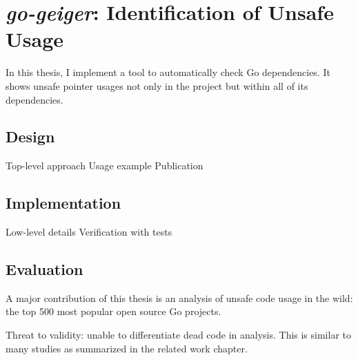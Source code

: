 
\chapter{\textit{go-geiger}: Identification of Unsafe Usage}\label{ch:go-geiger}

In this thesis, I implement a tool to automatically check Go dependencies. It shows unsafe
pointer usages not only in the project but within all of its dependencies.





\section{Design}\label{sec:go-geiger:design}



Top-level approach
Usage example
Publication



\section{Implementation}\label{sec:go-geiger:implementation}

Low-level details
Verification with tests



\section{Evaluation}\label{sec:go-geiger-evaluation}

A major contribution of this thesis is an analysis of unsafe code usage in the wild:
the top 500 most popular open source Go projects.

Threat to validity: unable to differentiate dead code in analysis.
This is similar to many studies as summarized in the related work chapter.


